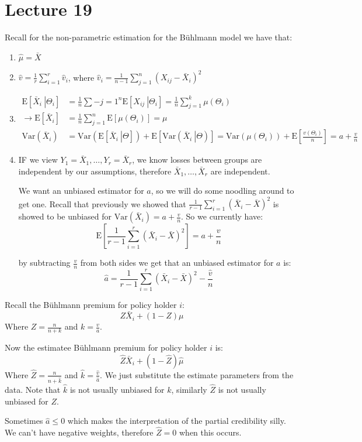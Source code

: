 \documentclass[english,12pt]{article}
\theoremstyle{plain}
\theoremstyle{definition}
\theoremstyle{definition} %
\newcommand{\enum}[1]{\begin{enumerate} #1 \end{enumerate}}
\newcommand{\ex}[1]{\mbox{E} \left[ #1 \right]}
\newcommand{\var}[1]{\mbox{Var} \left( #1 \right)}
\newcommand{\condex}[2]{\mbox{E} \left[ \left. #1 \ \right\vert \left. #2 \right. \right]}
\newcommand{\condvar}[2]{\mbox{Var} \left( \left. #1 \ \right\lvert \left. #2 \right. \right)}
\begin{document}
\section*{Lecture 19}
Recall for the non-parametric estimation for the B\"{u}hlmann model we have that:
\enum{
\item $\hat\mu=\bar{X}$
\item $\hat{v}=\frac{1}{r}\sum\limits_{i=1}^r\hat{v}_i$, where $\hat{v}_i=\frac{1}{n-1}\sum_{j=1}^n(X_{ij}-\bar{X}_i)^2$
\item 
\begin{align*}
\condex{\bar{X}_i}{\Theta_i}&=\frac{1}{n}\sum-{j=1}^n\condex{X_{ij}}{\Theta_i}
=\frac{1}{n}\sum_{j=1}^k\mu(\Theta_i)\\
\rightarrow \ex{\bar{X}_i}&=\frac{1}{n}\sum_{j=1}^n\ex{\mu(\Theta_i)}
=\mu\\
\var{\bar{X}_i}&=\var{\condex{\bar{X}_i}{\Theta}}+\ex{\condvar{\bar{X}_i}{\Theta}}
=\var{\mu(\Theta_i)}+\ex{\frac{v(\Theta_i)}{n}}
=a+\frac{v}{n}
\end{align*}

\item IF we view $Y_1=\bar{X}_1,\ldots,Y_r=\bar{X}_r$, we know losses between groups are independent by our assumptions, therefore $\bar{X}_1,\ldots,\bar{X}_r$ are independent.

We want an unbiased estimator for $a$, so we will do some noodling around to get one.  Recall that previously we showed that $\frac{1}{r-1}\sum_{i=1}^r(\bar{X}_i-\bar{X})^2$ is showed to be unbiased for $\var{\bar{X}_i}=a+\frac{v}{n}$.  So we currently have:
\[\ex{\frac{1}{r-1}\sum_{i=1}^r(\bar{X}_i-\bar{X})^2}=a+\frac{v}{n}\]

by subtracting $\frac{v}{n}$ from both sides we get that an unbiased estimator for $a$ is:
\[\hat{a}=\frac{1}{r-1}\sum_{i=1}^r(\bar{X}_i-\bar{X})^2-\frac{\hat{v}}{n}\]
}

Recall the B\"{u}hlmann premium for policy holder $i$:
\[Z\bar{X}_i+(1-Z)\mu\]
Where $Z=\frac{n}{n+k}$ and $k=\frac{v}{a}$.

Now the estimatee B\"{u}hlmann premium for policy holder $i$ is:
\[\hat{Z}\bar{X}_i+(1-\hat{Z})\hat{\mu}\]
Where $\hat{Z}=\frac{n}{n+\hat{k}}$ and $\hat{k}=\frac{\hat{v}}{\hat{a}}$.  We just substitute the estimate parameters from the data.  Note that $\hat{k}$ is not usually unbiased for $k$, similarly $\hat{Z}$ is not usually unbiased for $Z$.

Sometimes $\hat{a}\le 0$ which makes the interpretation of the partial credibility silly.  We can't have negative weights, therefore $\hat{Z}=0$ when this occurs.
\end{document}
